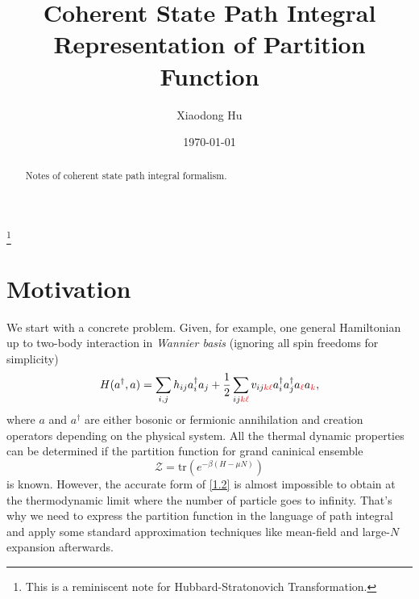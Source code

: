 \documentclass[10pt,nofootinbib]{revtex4}
\newcounter{Note}[section]
\begin{document}
\title{Coherent State Path Integral Representation of Partition Function}%
\thanks{This is a reminiscent note for Hubbard-Stratonovich Transformation.}%

\author{Xiaodong Hu}

\date{\today}


\begin{abstract}
Notes of coherent state path integral formalism.
\end{abstract}
\maketitle
\tableofcontents
\section{Motivation}
	We start with a concrete problem. Given, for example, one general Hamiltonian up to two-body interaction in \emph{Wannier basis} (ignoring all spin freedoms for simplicity)
	\begin{equation}\label{1.1}
		H(a^\dagger,a)=\sum_{i,j}h_{ij}a_i^\dagger a_j+\dfrac{1}{2}\sum_{ij{\color{red}k\ell}}v_{ij{\color{red}k\ell}}a_i^\dagger a_j^\dagger a_{\color{red}\ell} a_{\color{red}k},
	\end{equation}
	where $a$ and $a^\dagger$ are either bosonic or fermionic annihilation and creation operators depending on the physical system. All the thermal dynamic properties can be determined if the partition function for grand caninical ensemble
	\begin{equation}\label{1.2}
		\mathcal{Z}=\mathrm{tr}\left(e^{-\beta(H-\mu N)}\right) 
	\end{equation}
	is known. However, the accurate form of \eqref{1.2} is almost impossible to obtain at the thermodynamic limit where the number of particle goes to infinity. That's why we need to express the partition function in the language of path integral and apply some standard approximation techniques like mean-field and large-$N$ expansion afterwards.
\end{document}
